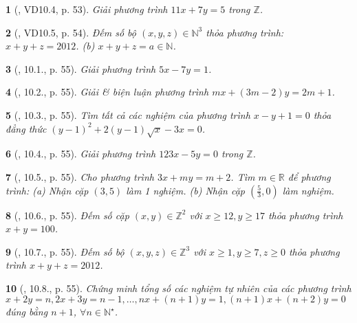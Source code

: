 \documentclass{article}
\newtheorem{baitoan}{}
\begin{document}
\begin{baitoan}[\cite{TLCT_THCS_Toan_9_dai_so}, VD10.4, p. 53]
	Giải phương trình $11x + 7y = 5$ trong $\mathbb{Z}$.
\end{baitoan}

\begin{baitoan}[\cite{TLCT_THCS_Toan_9_dai_so}, VD10.5, p. 54]
	Đếm số bộ $(x,y,z)\in\mathbb{N}^3$ thỏa phương trình: $x + y + z = 2012$. (b) $x + y + z = a\in\mathbb{N}$.
\end{baitoan}

\begin{baitoan}[\cite{TLCT_THCS_Toan_9_dai_so}, 10.1., p. 55]
	Giải phương trình $5x - 7y = 1$.
\end{baitoan}

\begin{baitoan}[\cite{TLCT_THCS_Toan_9_dai_so}, 10.2., p. 55]
	Giải \& biện luận phương trình $mx + (3m - 2)y = 2m + 1$.
\end{baitoan}

\begin{baitoan}[\cite{TLCT_THCS_Toan_9_dai_so}, 10.3., p. 55]
	Tìm tất cả các nghiệm của phương trình $x - y + 1 = 0$ thỏa đẳng thức $(y - 1)^2 + 2(y - 1)\sqrt{x} - 3x = 0$.
\end{baitoan}

\begin{baitoan}[\cite{TLCT_THCS_Toan_9_dai_so}, 10.4., p. 55]
	Giải phương trình $123x - 5y = 0$ trong $\mathbb{Z}$.
\end{baitoan}

\begin{baitoan}[\cite{TLCT_THCS_Toan_9_dai_so}, 10.5., p. 55]
	Cho phương trình $3x + my = m + 2$. Tìm $m\in\mathbb{R}$ để phương trình: (a) Nhận cặp $(3,5)$ làm 1 nghiệm. (b) Nhận cặp $\left(\frac{5}{3},0\right)$ làm nghiệm.
\end{baitoan}

\begin{baitoan}[\cite{TLCT_THCS_Toan_9_dai_so}, 10.6., p. 55]
	Đếm số cặp $(x,y)\in\mathbb{Z}^2$ với $x\ge12,y\ge17$ thỏa phương trình $x + y = 100$.
\end{baitoan}

\begin{baitoan}[\cite{TLCT_THCS_Toan_9_dai_so}, 10.7., p. 55]
	Đếm số bộ $(x,y,z)\in\mathbb{Z}^3$ với $x\ge1,y\ge7,z\ge0$ thỏa phương trình $x + y + z = 2012$.
\end{baitoan}

\begin{baitoan}[\cite{TLCT_THCS_Toan_9_dai_so}, 10.8., p. 55]
	Chứng minh tổng số các nghiệm tự nhiên của các phương trình $x + 2y = n,2x + 3y = n - 1,\ldots,nx + (n + 1)y = 1,(n + 1)x + (n + 2)y = 0$ đúng bằng $n + 1$, $\forall n\in\mathbb{N}^\star$.
\end{baitoan}
\end{document}

